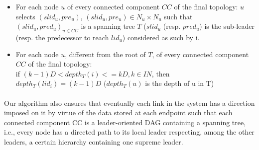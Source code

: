 \begin{itemize}
	\item For each node $u$ of every connected component $CC$ of the final topology:
	$u$ selects $(slid_u, pre_u)$, ${(slid_u, pre_u) \in N_u \times N_u}$ such that ${(slid_u, pred_u)}_{u \in CC}$ is a spanning tree $T$ ($slid_u$ (resp. $pred_u$) is the sub-leader (resp. the predecessor to reach $lid_u$) considered as such by i.
	\item For each node $u$, different from the root of $T$, of every connected component $CC$ of the final topology:\\
	if $ (k-1)D < depth_T (i) <= kD, k \in IN $, then $ depth_T(lid_i)=(k-1)D$ ($depth_T(u)$ is the depth of u in T)
\end{itemize}

\paragraph{}Our algorithm also ensures that eventually each link in the system has a direction imposed on it by virtue of the data stored at each endpoint such that each connected component CC is a leader-oriented DAG containing a spanning tree, i.e., every node has a directed path to its local leader respecting, among the other leaders, a certain hierarchy containing one supreme leader.